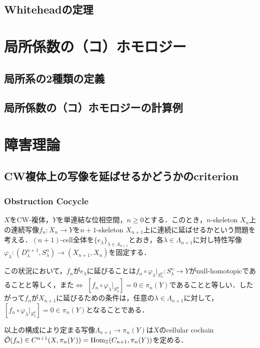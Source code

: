 \documentclass[a4paper,11pt]{jsarticle}
\theoremstyle{definition}
\DeclareMathOperator{\Hom}{\mathrm{Hom}}
\begin{document}
\subsection{Whiteheadの定理}
\section{局所係数の（コ）ホモロジー}
\subsection{局所系の2種類の定義}
\subsection{局所係数の（コ）ホモロジーの計算例}
\section{障害理論}
\subsection{CW複体上の写像を延ばせるかどうかのcriterion}
\subsubsection{Obstruction Cocycle}
$X$をCW-複体，$Y$を単連結な位相空間，$n\ge 0$とする．このとき，$n$-skeleton $X_n$上の連続写像$f_n\colon X_n\to Y$を$n+1$-skeleton $X_{n+1}$上に連続に延ばせるかという問題を考える．$(n+1)$-cell全体を$\{e_{\lambda}\}_{\lambda\in \Lambda_{n+1}}$とおき，各$\lambda\in\Lambda_{n+1}$に対し特性写像$\varphi_\lambda\colon (D^{n+1}_\lambda,S^n_\lambda)\to (X_{n+1},X_n)$を固定する．

この状況において，$f_n$が$e_\lambda$に延びることは$f_n\circ\varphi_\lambda|_{S^n_\lambda}\colon S^n_\lambda\to Y$がnull-homotopicであることと等しく，また$\Leftrightarrow$ $[f_n\circ \varphi_\lambda|_{S^n_\lambda}]=0\in \pi_n(Y)$であることと等しい．したがって$f_n$が$X_{n+1}$に延びるための条件は，任意の$\lambda\in\Lambda_{n+1}$に対して，$[f_n\circ \varphi_\lambda|_{S^n_\lambda}]=0\in \pi_n(Y)$となることである．

以上の構成により定まる写像$\Lambda_{n+1}\to \pi_n(Y)$は$X$のcellular cochain $\Tilde{\mathcal{O}}(f_n)\in C^{n+1}(X,\pi_n(Y))=\Hom_\mathbb{Z}(C_{n+1},\pi_n(Y))$を定める．
\end{document}
